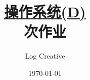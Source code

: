 \documentclass[12pt,a4paper]{article}
\newenvironment{problems}{\begin{list}{}{\renewcommand{\makelabel}[1]{\textbf{##1}\hfil}}}{\end{list}}
\providecommand{\sol}{\textbf{解}.~}
\begin{document}
\title{\normalsize \underline{操作系统(D)}\\ 次作业}
\author{Log Creative }
\date{\today}
\maketitle

\begin{problems}
    
    


        
        
        


\end{problems}
\end{document}
